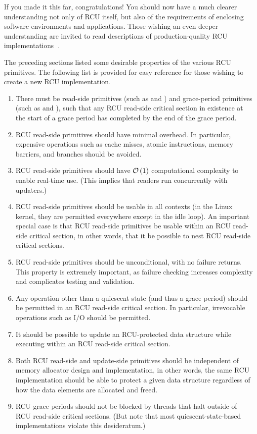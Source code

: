 If you made it this far, congratulations!
You should now have a much clearer understanding
not only of RCU itself, but also of the requirements of enclosing
software environments and applications.
Those wishing an even deeper understanding are invited to read
descriptions of production-quality RCU
implementations~\cite{MathieuDesnoyers2012URCU,PaulEMcKenney2007PreemptibleRCU,PaulEMcKenney2008HierarchicalRCU,PaulEMcKenney2009BloatwatchRCU}.

The preceding sections listed some desirable properties of the
various RCU primitives.
The following list is provided for easy reference for those wishing to
create a new RCU implementation.

\begin{enumerate}
\item	There must be read-side primitives (such as 
	and ) and grace-period primitives
	(such as  and ), such
	that any RCU read-side critical section in existence at the
	start of a grace period has completed by the end of the
	grace period.
\item	RCU read-side primitives should have minimal overhead.
	In particular, expensive operations such as cache misses,
	atomic instructions, memory barriers, and branches should
	be avoided.
\item	RCU read-side primitives should have $\mathcal{O}\left(1\right)$ computational
	complexity to enable real-time use.
	(This implies that readers run concurrently with updaters.)
\item	RCU read-side primitives should be usable in all contexts
	(in the Linux kernel, they are permitted everywhere except in
	the idle loop).
	An important special case is that RCU read-side primitives be
	usable within an RCU read-side critical section, in other words,
	that it be possible to nest RCU read-side critical sections.
\item	RCU read-side primitives should be unconditional, with no
	failure returns.
	This property is extremely important, as failure checking
	increases complexity and complicates testing and validation.
\item	Any operation other than a quiescent state (and thus a grace
	period) should be permitted in an RCU read-side critical section.
	In particular, irrevocable operations such as I/O should be
	permitted.
\item	It should be possible to update an RCU-protected data structure
	while executing within an RCU read-side critical section.
\item	Both RCU read-side and update-side primitives should be independent
	of memory allocator design and implementation, in other words,
	the same RCU implementation should be able to protect a given
	data structure regardless of how the data elements are allocated
	and freed.
\item	RCU grace periods should not be blocked by threads that
	halt outside of RCU read-side critical sections.
	(But note that most quiescent-state-based implementations
	violate this desideratum.)
\end{enumerate}

